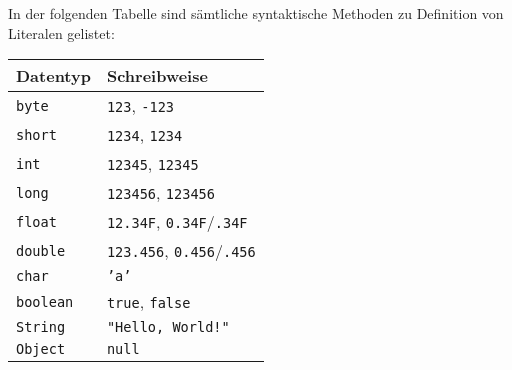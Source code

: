 	In der folgenden Tabelle sind sämtliche syntaktische Methoden zu Definition von Literalen gelistet:
	\begin{table}[H]
		\centering
		\begin{tabular}{l | l}
			\textbf{Datentyp} & \textbf{Schreibweise}                          \\ \hline
			\texttt{byte}     & \texttt{123}, \texttt{-123}                    \\
			\texttt{short}    & \texttt{1234}, \texttt{1234}                   \\
			\texttt{int}      & \texttt{12345}, \texttt{12345}                 \\
			\texttt{long}     & \texttt{123456}, \texttt{123456}               \\
			\texttt{float}    & \texttt{12.34F}, \texttt{0.34F}/\texttt{.34F}  \\
			\texttt{double}   & \texttt{123.456}, \texttt{0.456}/\texttt{.456} \\
			\texttt{char}     & \texttt{'a'}                                   \\
			\texttt{boolean}  & \texttt{true}, \texttt{false}                  \\
			\texttt{String}   & \texttt{"Hello, World!"}                       \\
			\texttt{Object}   & \texttt{null}
		\end{tabular}
	\end{table}
	
